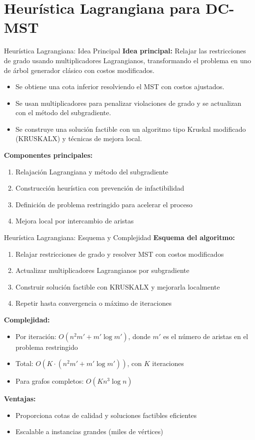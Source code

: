 \documentclass{beamer}
\begin{document}
\section{Heurística Lagrangiana para DC-MST}
\begin{frame}{Heurística Lagrangiana: Idea Principal}
\textbf{Idea principal:} Relajar las restricciones de grado usando multiplicadores Lagrangianos, transformando el problema en uno de árbol generador clásico con costos modificados.
\begin{itemize}
  \item Se obtiene una cota inferior resolviendo el MST con costos ajustados.
  \item Se usan multiplicadores para penalizar violaciones de grado y se actualizan con el método del subgradiente.
  \item Se construye una solución factible con un algoritmo tipo Kruskal modificado (KRUSKALX) y técnicas de mejora local.
\end{itemize}
\textbf{Componentes principales:}
\begin{enumerate}
  \item Relajación Lagrangiana y método del subgradiente
  \item Construcción heurística con prevención de infactibilidad
  \item Definición de problema restringido para acelerar el proceso
  \item Mejora local por intercambio de aristas
\end{enumerate}
\end{frame}

\begin{frame}{Heurística Lagrangiana: Esquema y Complejidad}
\textbf{Esquema del algoritmo:}
\begin{enumerate}
  \item Relajar restricciones de grado y resolver MST con costos modificados
  \item Actualizar multiplicadores Lagrangianos por subgradiente
  \item Construir solución factible con KRUSKALX y mejorarla localmente
  \item Repetir hasta convergencia o máximo de iteraciones
\end{enumerate}
\vspace{0.2cm}
\textbf{Complejidad:}
\begin{itemize}
  \item Por iteración: $O(n^2 m' + m' \log m')$, donde $m'$ es el número de aristas en el problema restringido
  \item Total: $O(K \cdot (n^2 m' + m' \log m'))$, con $K$ iteraciones
  \item Para grafos completos: $O(K n^3 \log n)$
\end{itemize}
\textbf{Ventajas:}
\begin{itemize}
  \item Proporciona cotas de calidad y soluciones factibles eficientes
  \item Escalable a instancias grandes (miles de vértices)
\end{itemize}
\end{frame}
\end{document}

